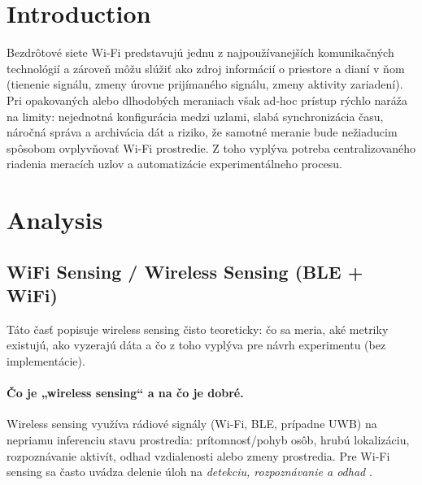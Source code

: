 
\section{Introduction}
\label{sec:introduction}

Bezdrôtové siete Wi‑Fi predstavujú jednu z najpoužívanejších komunikačných technológií a zároveň môžu slúžiť
ako zdroj informácií o priestore a dianí v ňom (tienenie signálu, zmeny úrovne prijímaného signálu, zmeny
aktivity zariadení). Pri opakovaných alebo dlhodobých meraniach však ad‑hoc prístup rýchlo naráža na limity:
nejednotná konfigurácia medzi uzlami, slabá synchronizácia času, náročná správa a archivácia dát a riziko,
že samotné meranie bude nežiaducim spôsobom ovplyvňovať Wi‑Fi prostredie. Z toho vyplýva potreba
centralizovaného riadenia meracích uzlov a automatizácie experimentálneho procesu.

\section{Analysis}
\label{sec:analysis}

\subsection{WiFi Sensing / Wireless Sensing (BLE + WiFi)}
\label{subsec:wifi-sensing}

Táto časť popisuje wireless sensing čisto teoreticky: čo sa meria, aké metriky existujú, ako vyzerajú dáta
a čo z toho vyplýva pre návrh experimentu (bez implementácie).

\paragraph{Čo je „wireless sensing“ a na čo je dobré.}
Wireless sensing využíva rádiové signály (Wi‑Fi, BLE, prípadne UWB) na nepriamu inferenciu stavu prostredia:
prítomnosť/pohyb osôb, hrubú lokalizáciu, rozpoznávanie aktivít, odhad vzdialenosti alebo zmeny prostredia.
Pre Wi‑Fi sensing sa často uvádza delenie úloh na \textit{detekciu, rozpoznávanie a odhad} \cite{ma2019wifisense_survey}.

